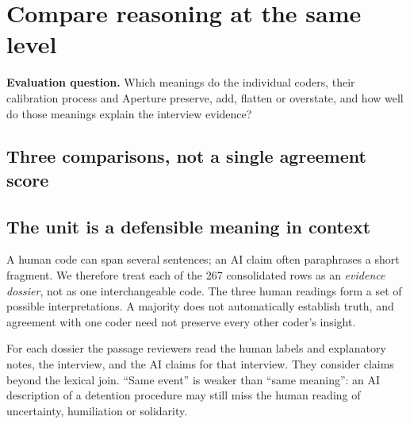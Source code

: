 \documentclass[10pt,a4paper]{article}
\newcommand{\kicker}[1]{{\sffamily\small\bfseries\color{teal}#1}\par\vspace{5pt}}
\newcommand{\page}[2]{\clearpage\kicker{#1}\section*{#2}}
\begin{document}
\page{01 / EVALUATION STRATEGY}{Compare reasoning at the same level}
\begin{takeaway}
\textbf{Evaluation question.} Which meanings do the individual coders, their calibration process and Aperture preserve, add, flatten or overstate, and how well do those meanings explain the interview evidence?
\end{takeaway}
\subsection*{Three comparisons, not a single agreement score}
\subsection*{The unit is a defensible meaning in context}
A human code can span several sentences; an AI claim often paraphrases a short fragment. We therefore treat each of the 267 consolidated rows as an \emph{evidence dossier}, not as one interchangeable code. The three human readings form a set of possible interpretations. A majority does not automatically establish truth, and agreement with one coder need not preserve every other coder's insight.

For each dossier the passage reviewers read the human labels and explanatory notes, the interview, and the AI claims for that interview. They consider claims beyond the lexical join. ``Same event'' is weaker than ``same meaning'': an AI description of a detention procedure may still miss the human reading of uncertainty, humiliation or solidarity.
\end{document}
